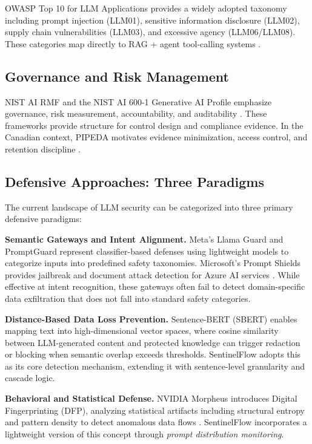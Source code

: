 \documentclass[12pt,a4paper]{article}
\begin{document}
OWASP Top 10 for LLM Applications provides a widely adopted taxonomy including prompt injection (LLM01), sensitive information disclosure (LLM02), supply chain vulnerabilities (LLM03), and excessive agency (LLM06/LLM08). These categories map directly to RAG + agent tool-calling systems \cite{owasp_llm_2025}.

\subsection{Governance and Risk Management}

NIST AI RMF and the NIST AI 600-1 Generative AI Profile emphasize governance, risk measurement, accountability, and auditability \cite{nist_ai_rmf, nist_ai_600_1}. These frameworks provide structure for control design and compliance evidence. In the Canadian context, PIPEDA motivates evidence minimization, access control, and retention discipline \cite{pipeda_guidance}.

\subsection{Defensive Approaches: Three Paradigms}

The current landscape of LLM security can be categorized into three primary defensive paradigms:

\textbf{Semantic Gateways and Intent Alignment.} Meta's Llama Guard \cite{llama_guard} and PromptGuard represent classifier-based defenses using lightweight models to categorize inputs into predefined safety taxonomies. Microsoft's Prompt Shields provides jailbreak and document attack detection for Azure AI services \cite{ms_prompt_shields}. While effective at intent recognition, these gateways often fail to detect domain-specific data exfiltration that does not fall into standard safety categories.

\textbf{Distance-Based Data Loss Prevention.} Sentence-BERT (SBERT) \cite{sbert} enables mapping text into high-dimensional vector spaces, where cosine similarity between LLM-generated content and protected knowledge can trigger redaction or blocking when semantic overlap exceeds thresholds. SentinelFlow adopts this as its core detection mechanism, extending it with sentence-level granularity and cascade logic.

\textbf{Behavioral and Statistical Defense.} NVIDIA Morpheus introduces Digital Fingerprinting (DFP), analyzing statistical artifacts including structural entropy and pattern density to detect anomalous data flows \cite{nvidia_morpheus}. SentinelFlow incorporates a lightweight version of this concept through \textit{prompt distribution monitoring}.
\end{document}
